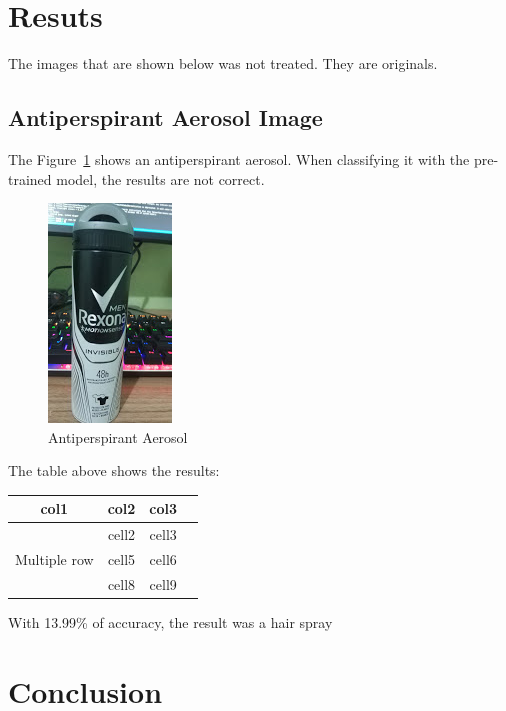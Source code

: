 \documentclass[12pt]{article}
\begin{document}
\section{Resuts}

The images that are shown below was not treated. They are originals.

\subsection{Antiperspirant Aerosol Image}

The Figure~\ref{fig:image1} shows an antiperspirant aerosol. When classifying it with the pre-trained model, the results are not correct.

\begin{figure}[H]
\centering
\includegraphics[width=.2\textwidth]{images/rexona.jpg}
\caption{Antiperspirant Aerosol}
\label{fig:image1}
\end{figure}

The table above shows the results:

\begin{center}
  \begin{tabular}{ |c|c|c|c| } 
  \hline
  col1 & col2 & col3 \\
  \hline
  \multirow{3}{4em}{Multiple row} & cell2 & cell3 \\ 
  & cell5 & cell6 \\ 
  & cell8 & cell9 \\ 
  \hline
  \end{tabular}
  \end{center}

With 13.99\% of accuracy, the result was a hair spray

\section{Conclusion}




\end{document}
